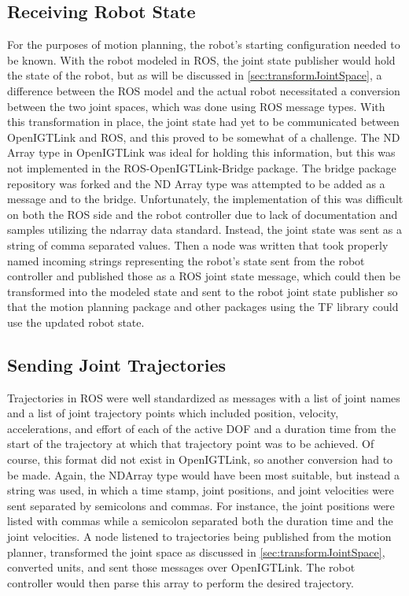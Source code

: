 \documentclass[12pt]{report}
\begin{document}
\subsection{Receiving Robot State}
\label{sec:receivingRobotState}
For the purposes of motion planning, the robot's starting configuration needed to be known. With the robot modeled in ROS, the joint state publisher would hold the state of the robot, but as will be discussed in \autoref{sec:transformJointSpace}, a difference between the ROS model and the actual robot necessitated a conversion between the two joint spaces, which was done using ROS message types. With this transformation in place, the joint state had yet to be communicated between OpenIGTLink and ROS, and this proved to be somewhat of a challenge. The ND Array type in OpenIGTLink was ideal for holding this information, but this was not implemented in the ROS-OpenIGTLink-Bridge package. The bridge package repository was forked and the ND Array type was attempted to be added as a message and to the bridge. Unfortunately, the implementation of this was difficult on both the ROS side and the robot controller due to lack of documentation and samples utilizing the ndarray data standard. Instead, the joint state was sent as a string of comma separated values. Then a node was written that took properly named incoming strings representing the robot's state sent from the robot controller and published those as a ROS joint state message, which could then be transformed into the modeled state and sent to the robot joint state publisher so that the motion planning package and other packages using the TF library could use the updated robot state.


\subsection{Sending Joint Trajectories}
Trajectories in ROS were well standardized as messages with a list of joint names and a list of joint trajectory points which included position, velocity, accelerations, and effort of each of the active DOF and a duration time from the start of the trajectory at which that trajectory point was to be achieved. Of course, this format did not exist in OpenIGTLink, so another conversion had to be made. Again, the NDArray type would have been most suitable, but instead a string was used, in which a time stamp, joint positions, and joint velocities were sent separated by semicolons and commas. For instance, the joint positions were listed with commas while a semicolon separated both the duration time and the joint velocities. A node listened to trajectories being published from the motion planner, transformed the joint space as discussed in \autoref{sec:transformJointSpace}, converted units, and sent those messages over OpenIGTLink. The robot controller would then parse this array to perform the desired trajectory.
\end{document}
